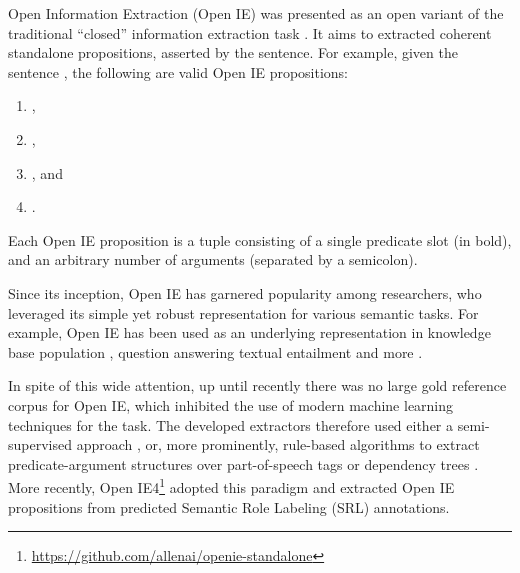 Open Information Extraction (Open IE)
was presented as an open variant of the traditional ``closed'' information extraction task \cite{etzioni2008open}.
It aims to extracted coherent standalone propositions, asserted by the sentence.
For example, given the sentence
,
the following are valid Open IE propositions:
\begin{enumerate}
\item {},
\item {},
\item {}, and
\item {}.
\end{enumerate}
Each Open IE proposition is a tuple consisting of a single predicate slot (in bold), and an arbitrary number of arguments (separated by a semicolon).

Since its inception, Open IE has garnered popularity among researchers, who leveraged  its simple yet robust representation for various semantic tasks.
For example, Open IE has been used as an underlying representation in knowledge base population \cite{2015angeli-openie}, question answering \cite{fader2014open}
textual entailment \cite{Berant:ACL11} and more \cite{Melamud:ACL13,yang2016peak}.

In spite of this wide attention, up until recently there was no large gold reference corpus for Open IE,
which inhibited the use of modern machine learning techniques for the task.
The developed extractors therefore used either a semi-supervised approach \cite{wu2010open,banko2007open}, or, more prominently, rule-based algorithms to extract predicate-argument structures over part-of-speech tags \cite{fader2011identifying} or  dependency trees \cite{mausam2012open,del2013clausie,props2016}.
More recently, Open IE4\footnote{\url{https://github.com/allenai/openie-standalone}} adopted this paradigm and extracted Open IE propositions from predicted Semantic Role Labeling (SRL)
annotations.


